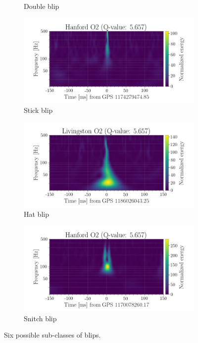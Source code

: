 \documentclass[a4paper]{article}
\begin{document}
\begin{figure}[h!]
\begin{subfigure}{.49\textwidth}
		\caption{Double blip}
		\label{fig:double_O2}
	\end{subfigure}
	\begin{subfigure}{.49\textwidth}
		\centering
		\includegraphics[width=1\linewidth]{stick_O2}
		\caption{Stick blip}
		\label{fig:stick_O2}
	\end{subfigure}
	\begin{subfigure}{.49\textwidth}
		\centering
		\includegraphics[width=1\linewidth]{hat_O2}
		\caption{Hat blip}
		\label{fig:hat_O2}
	\end{subfigure}
	\begin{subfigure}{.49\textwidth}
		\centering
		\includegraphics[width=1\linewidth]{snitch_O2}
		\caption{Snitch blip}
		\label{fig:snitch_O2}
	\end{subfigure}
	\caption{Six possible sub-classes of blips.}
	\label{fig:six}
\end{figure}
\end{document}

